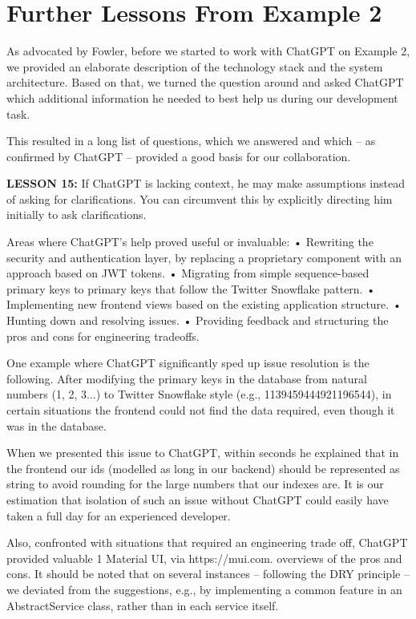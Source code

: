 \documentclass[runningheads]{llncs}
\begin{document}
\section{Further Lessons From Example 2}
As advocated by Fowler\cite{Fowler2023}, before we started to work with ChatGPT on Example 2, we provided an elaborate description of the technology stack and the system architecture. Based on that, we turned the question around and asked ChatGPT which additional information he needed to best help us during our development task.

This resulted in a long list of questions, which we answered and which – as confirmed by ChatGPT – provided a good basis for our collaboration.

\textbf{LESSON 15:} If ChatGPT is lacking context, he may make assumptions instead of asking for clarifications. You can circumvent this by explicitly directing him initially to ask clarifications.

Areas where ChatGPT's help proved useful or invaluable:
• Rewriting the security and authentication layer,
by replacing a proprietary component with an
approach based on JWT tokens.
• Migrating from simple sequence-based primary
keys to primary keys that follow the Twitter
Snowflake pattern.
• Implementing new frontend views based on the
existing application structure.
• Hunting down and resolving issues.
• Providing feedback and structuring the pros and
cons for engineering tradeoffs.

One example where ChatGPT significantly sped up issue resolution is the following. After modifying the primary keys in the database from natural numbers (1, 2, 3...) to Twitter Snowflake style (e.g., 1139459444921196544), in certain situations the frontend could not find the data required, even though it was in the database.

When we presented this issue to ChatGPT, within seconds he explained that in the frontend our ids (modelled as long in our backend) should be represented as string to avoid rounding for the large numbers that our indexes are. It is our estimation that isolation of such an issue without ChatGPT could easily have taken a full day for an experienced developer.

Also, confronted with situations that required an engineering trade off, ChatGPT provided valuable
1 Material UI, via https://mui.com.
overviews of the pros and cons. It should be noted that on several instances – following the DRY principle – we deviated from the suggestions, e.g., by implementing a common feature in an AbstractService class, rather than in each service itself.
\end{document}
